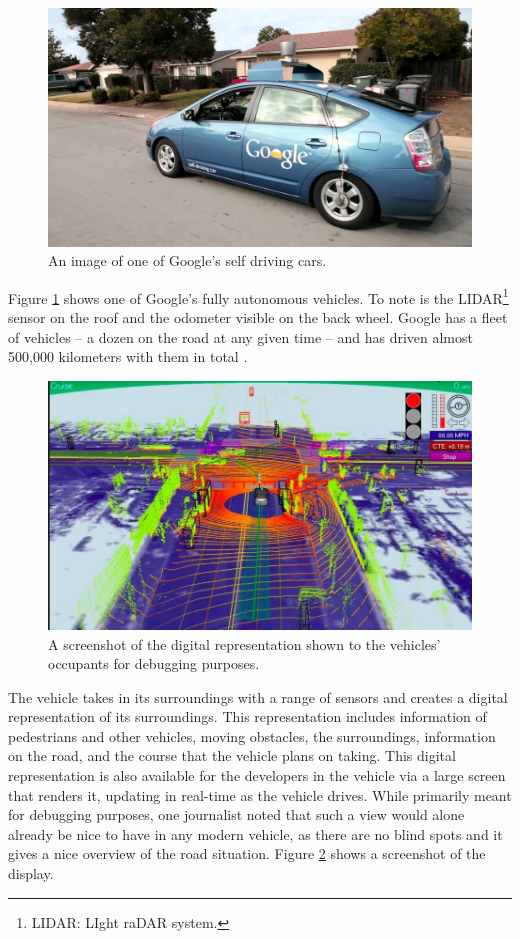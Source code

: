 \documentclass{acm_proc_article-sp}
\begin{document}
\begin{figure}
	\centering
	\includegraphics[width=\columnwidth]{img/google_vehicle.jpg}
	\caption[Google Self Driving Car]{An image of one of Google's self driving cars.}
	\label{fig:google_vehicle}
\end{figure}

Figure \ref{fig:google_vehicle} shows one of Google's fully autonomous vehicles.
To note is the LIDAR\footnote{LIDAR: LIght raDAR system.} sensor on the roof and the odometer visible on the back wheel.
Google has a fleet of vehicles – a dozen on the road at any given time – and has driven almost 500,000 kilometers with them in total \cite{www:google_blog_miles}.

\begin{figure}
	\centering
	\includegraphics[width=\columnwidth]{img/google_tech_view.jpg}
	\caption[Tech View]{A screenshot of the digital representation shown to the vehicles' occupants for debugging purposes.}
	\label{fig:google_tech_view}
\end{figure}

The vehicle takes in its surroundings with a range of sensors and creates a digital representation of its surroundings.
This representation includes information of pedestrians and other vehicles, moving obstacles, the surroundings, information on the road, and the course that the vehicle plans on taking.
This digital representation is also available for the developers in the vehicle via a large screen that renders it, updating in real-time as the vehicle drives.
While primarily meant for debugging purposes, one journalist noted that such a view would alone already be nice to have in any modern vehicle, as there are no blind spots and it gives a nice overview of the road situation.
Figure \ref{fig:google_tech_view} shows a screenshot of the display.
\end{document}
